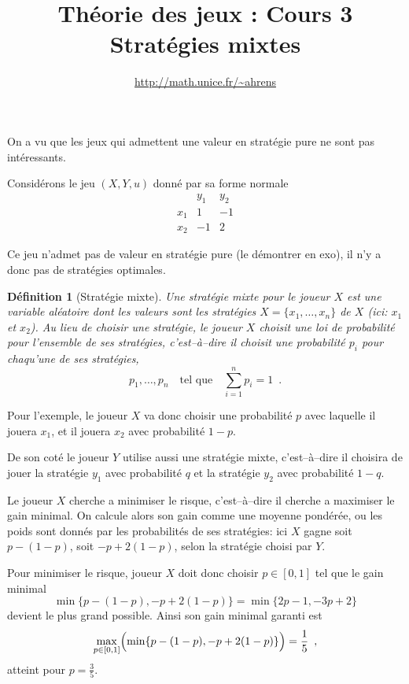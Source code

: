 \documentclass[11pt]{scrartcl}
\title{Th\'eorie des jeux : Cours 3 \\ {\large Strat\'egies mixtes}}
\author{\url{http://math.unice.fr/~ahrens}}
\date{}
\theoremstyle{mydefinition}
\newtheorem{definition}{D\'efinition}
\theoremstyle{myplain}
\begin{document}
\maketitle


On a vu que les jeux qui admettent une valeur en strat\'egie pure ne sont pas int\'eressants.

Consid\'erons le jeu $(X,Y,u)$ donn\'e par sa forme normale
\[
\begin{array}{l|rr}
    & y_1 & y_2  \\ \hline
x_1 &  1 & -1  \\
x_2 &   -1 & 2
\end{array} 
\]
 
Ce jeu n'admet pas de valeur en strat\'egie pure (le d\'emontrer en exo), il n'y a donc pas de strat\'egies optimales.

\begin{definition}[Strat\'egie mixte]
   Une \emph{strat\'egie mixte} pour le joueur $X$ est une variable al\'eatoire dont les valeurs 
sont les strat\'egies $X=\{x_1,\ldots,x_n\}$ de $X$ (ici: $x_1$ et $x_2$).
   Au lieu de choisir \emph{une} strat\'egie, le joueur $X$ choisit une loi de probabilit\'e pour l'ensemble de ses strat\'egies, c'est--\`a--dire
 il choisit une probabilit\'e $p_i$ pour chaqu'une de ses strat\'egies, 
  \[ p_1, \ldots, p_n \quad\text{tel que}\quad \sum_{i=1}^n p_i = 1 \enspace . 
  \]
\end{definition}

Pour l'exemple, le joueur $X$ va donc choisir une probabilit\'e $p$ avec laquelle il jouera $x_1$, et il jouera $x_2$ avec probabilit\'e $1-p$.

De son cot\'e le joueur $Y$ utilise aussi une strat\'egie mixte, c'est--\`a--dire il choisira de jouer la strat\'egie $y_1$ avec probabilit\'e $q$
 et la strat\'egie $y_2$ avec probabilit\'e $1-q$.

Le joueur $X$ cherche a minimiser le risque, c'est--\`a--dire il cherche a maximiser le gain minimal.
On calcule alors son gain comme une moyenne pond\'er\'ee, ou les poids sont donn\'es par les probabilit\'es de
ses strat\'egies:
ici $X$ gagne soit $p - (1-p)$, soit $-p +2(1-p)$, selon la strat\'egie choisi par $Y$.

Pour minimiser le risque, joueur $X$ doit donc choisir $p\in [0,1]$ tel que le gain minimal 
    \[ \min \{ p - (1-p), -p +2(1-p)\} = \min\{2p-1, -3p + 2 \} \]
devient le plus grand possible. Ainsi son gain minimal garanti est
    \[ \max_{p\in [0,1]} \Bigl( \min \{ p - (1-p), -p +2(1-p)\} \Bigr) = \frac{1}{5} \enspace, \]
atteint pour $p = \frac{3}{5}$.
\end{document}
